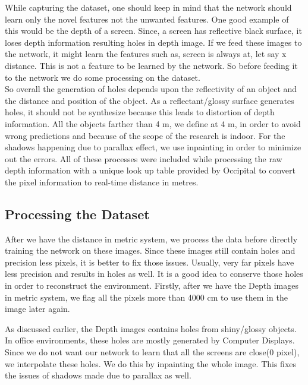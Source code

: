 While capturing the dataset, one should keep in mind that the network should learn only the novel features not the unwanted features. One good example of this would be the depth of a screen. Since, a screen has reflective black surface, it loses depth information resulting holes in depth image. If we feed these images to the network, it might learn the features such as, screen is always at, let say x distance. This is not a feature to be learned by the network. So before feeding it to the network we do some processing on the dataset.\\

So overall the generation of holes depends upon the reflectivity of an object and the distance and position of the object. As a reflectant/glossy surface generates holes, it should not be synthesize because this leads to distortion of depth information.  All the objects farther than 4 m, we define at 4 m, in order to avoid wrong predictions and because of the scope of the research is indoor. For the shadows happening due to parallax effect, we use inpainting in order to minimize out the errors. All of these processes were included while processing the raw depth information with a unique look up table provided by Occipital to convert the pixel information to real-time distance in metres.\\

\subsection{Processing the Dataset}

After we have the distance in metric system, we process the data before directly training the network on these images. Since these images still contain holes and precision less pixels, it is better to fix those issues. Usually, very far pixels have less precision and results in holes as well. It is a good idea to conserve those holes in order to reconstruct the environment. Firstly, after we have the Depth images in metric system, we flag all the pixels more than 4000 cm to use them in the image later again.

As discussed earlier, the Depth images contains holes from shiny/glossy objects. In office environments, these holes are mostly generated by Computer Displays. Since we do not want our network to learn that all the screens are close(0 pixel), we interpolate these holes. We do this by inpainting the whole image. This fixes the issues of shadows made due to parallax as well. \\

